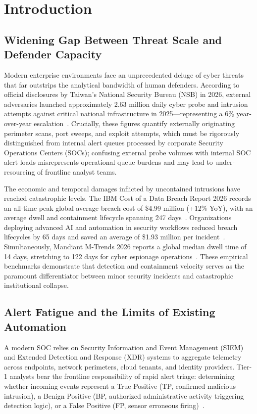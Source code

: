 \section{Introduction}
\label{sec:intro}

\subsection{Widening Gap Between Threat Scale and Defender Capacity}

Modern enterprise environments face an unprecedented deluge of cyber threats that
far outstrips the analytical bandwidth of human defenders. According to official
disclosures by Taiwan's National Security Bureau (NSB) in 2026, external adversaries
launched approximately 2.63 million daily cyber probe and intrusion attempts against
critical national infrastructure in 2025---representing a 6\% year-over-year
escalation~\cite{nsb2026taiwan}. Crucially, these figures quantify externally
originating perimeter scans, port sweeps, and exploit attempts, which must be
rigorously distinguished from internal alert queues processed by corporate Security
Operations Centers (SOCs); confusing external probe volumes with internal SOC alert
loads misrepresents operational queue burdens and may lead to under-resourcing
of frontline analyst teams.

The economic and temporal damages inflicted by uncontained intrusions have reached
catastrophic levels. The IBM Cost of a Data Breach Report 2026 records an all-time
peak global average breach cost of \$4.99 million (+12\% YoY), with an average dwell
and containment lifecycle spanning 247 days~\cite{ibm2026databreach}. Organizations
deploying advanced AI and automation in security workflows reduced breach lifecycles
by 65 days and saved an average of \$1.93 million per incident~\cite{ibm2026databreach}.
Simultaneously, Mandiant M-Trends 2026 reports a global median dwell time of 14 days,
stretching to 122 days for cyber espionage operations~\cite{mandiant2026mtrends}.
These empirical benchmarks demonstrate that detection and containment velocity serves
as the paramount differentiator between minor security incidents and catastrophic
institutional collapse.

\subsection{Alert Fatigue and the Limits of Existing Automation}

A modern SOC relies on Security Information and Event Management (SIEM) and Extended
Detection and Response (XDR) systems to aggregate telemetry across endpoints, network
perimeters, cloud tenants, and identity providers. Tier-1 analysts bear the frontline
responsibility of rapid alert triage: determining whether incoming events represent a
True Positive (TP, confirmed malicious intrusion), a Benign Positive (BP, authorized
administrative activity triggering detection logic), or a False Positive (FP, sensor
erroneous firing)~\cite{alahmadi2022falsepositives}.

